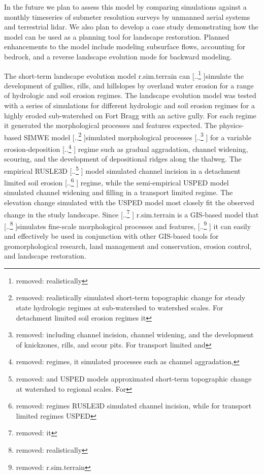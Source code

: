 \documentclass[gmd, manuscript]{copernicus}
\providecommand{\DIFadd}[1]{{\protect\color{blue} \sf #1}} %
\providecommand{\DIFdel}[1]{{\protect\color{red} [..\footnote{removed: #1} ]}} %
\providecommand{\DIFaddbegin}{} %
\providecommand{\DIFaddend}{} %
\providecommand{\DIFdelbegin}{} %
\providecommand{\DIFdelend}{} %
\begin{document}
\DIFadd{In the future we plan to assess this model
by comparing simulations against 
a monthly timeseries
of submeter resolution surveys
by unmanned aerial systems and terrestrial lidar. 
We also plan to develop a case study demonstrating
how the model can be used as a planning tool 
for landscape restoration. 
Planned enhancements to the model include 
modeling subsurface flows, 
accounting for bedrock, 
and a reverse landscape evolution mode
for backward modeling. 
}

\DIFaddend %
\conclusions

The short-term landscape evolution model 
r.sim.terrain can \DIFdelbegin \DIFdel{realistically }\DIFdelend simulate the development of 
gullies, rills, and hillslopes by overland water erosion
for a range of hydrologic and soil erosion regimes.
The landscape evolution model was tested
with a series of simulations for different 
hydrologic and soil erosion regimes
for a highly eroded sub-watershed on Fort Bragg
with an active gully.
For each regime it generated the 
morphological processes and features expected.
The physics-based SIMWE model 
\DIFdelbegin \DIFdel{realistically simulated short-term topographic change
for steady state hydrologic regimes
at sub-watershed to watershed scales. 
For detachment limited soil erosion regimes
it }\DIFdelend simulated morphological processes 
\DIFdelbegin \DIFdel{including
channel incision, channel widening, and 
the development of knickzones, rills, and scour pits.
For transport limited and }\DIFdelend \DIFaddbegin \DIFadd{for a }\DIFaddend variable erosion-deposition \DIFdelbegin \DIFdel{regimes,
it simulated processes such as 
channel aggradation, }\DIFdelend \DIFaddbegin \DIFadd{regime such as 
gradual aggradation, channel widening, 
}\DIFaddend scouring, and the development of
depositional ridges along the thalweg.
The empirical RUSLE3D \DIFdelbegin \DIFdel{and USPED models
approximated short-term topographic change
at watershed to regional scales. 
For }\DIFdelend \DIFaddbegin \DIFadd{model simulated channel incision
in a }\DIFaddend detachment limited soil erosion \DIFdelbegin \DIFdel{regimes 
RUSLE3D simulated channel incision,
while for transport limited regimes
USPED }\DIFdelend \DIFaddbegin \DIFadd{regime,
while the semi-empirical USPED model
}\DIFaddend simulated channel widening and filling
\DIFaddbegin \DIFadd{in a transport limited regime. 
The elevation change simulated with the USPED model
most closely fit the observed change in the study landscape}\DIFaddend .
Since \DIFdelbegin \DIFdel{it }\DIFdelend \DIFaddbegin \DIFadd{r.sim.terrain }\DIFaddend is a GIS-based model 
that \DIFdelbegin \DIFdel{realistically }\DIFdelend simulates fine-scale morphological processes and features,
\DIFdelbegin \DIFdel{r.sim.terrain }\DIFdelend \DIFaddbegin \DIFadd{it }\DIFaddend can easily and effectively be used 
in conjunction with other GIS-based tools
for geomorphological research,
land management and conservation,
erosion control, and landscape restoration. 
\end{document}
